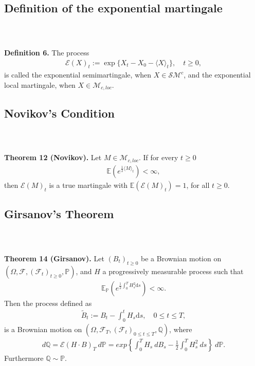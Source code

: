 \documentclass{beamer}
\numberwithin{equation}{section}
\newenvironment{frame2}{\begin{frame}\frametitle{{\normalsize \secname} \\ {\large \subsecname}}}{\end{frame}}
\begin{document}
\subsection{Definition of the exponential martingale}
\begin{frame2}
    \textbf{Definition 6.}
    The process
    \begin{align*}
        \mathcal{E}(X)_t:=\exp\{X_t-X_0-\langle X \rangle_t\}, \quad t\geq 0,
    \end{align*}
    is called the exponential semimartingale, when $X\in\mathcal{S}\mathcal{M}^c$, and the exponential local martingale, when $X\in\mathcal{M}_{c,loc}$.
\end{frame2}

\subsection{Novikov's Condition}
\begin{frame2}
    \textbf{Theorem 12 (Novikov).}
    Let $M\in\mathcal{M}_{c, loc}$.
    If for every $t\geq 0$
    \begin{align*}
        \mathbb{E}(e^{\frac{1}{2}\langle M\rangle_t})<\infty,
    \end{align*}
    then $\mathcal{E}(M)_t$ is a true martingale with $\mathbb{E}(\mathcal{E}(M)_t)=1$, for all $t\geq 0$.
\end{frame2}

\subsection{Girsanov's Theorem}
\begin{frame2}
    \textbf{Theorem 14 (Girsanov).}
    Let $(B_t)_{t\geq 0}$ be a Brownian motion on $(\Omega, \mathscr{F}, (\mathscr{F}_t)_{t\geq 0}, \mathbb{P})$, and $H$ a progressively measurable process such that 
    \begin{align*}
        \mathbb{E}_{\mathbb{P}}(e^{\frac{1}{2}\int_0^T H_s^2 \text{d}s})<\infty.
    \end{align*}
    Then the process defined as
    \begin{align*}
        \tilde{B}_t:=B_t-\int_0^t H_s \text{d}s, \quad 0\leq t\leq T,
    \end{align*}
    is a Brownian motion on $(\Omega, \mathscr{F}_T, (\mathscr{F}_t)_{0\leq t\leq T}, \mathbb{Q})$, where
    \begin{align*}
        d\mathbb{Q}=\mathcal{E}(H\cdot B)_T \ d \mathbb{P} = exp\left\{\int_0^T H_s \ d B_s - \frac{1}{2} \int_0^T H_s^2 \ ds\right\} \ d \mathbb{P}.
    \end{align*}
    Furthermore $\mathbb{Q} \sim \mathbb{P}$.
\end{frame2}
\end{document}
